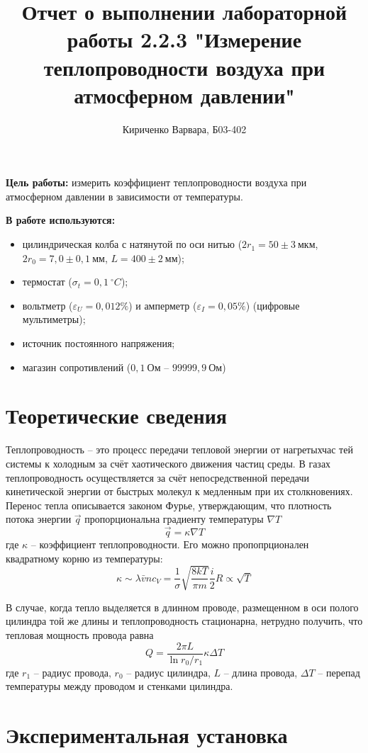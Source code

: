 \documentclass[12pt, a4paper]{article}
\title{\textbf{Отчет о выполнении лабораторной работы 2.2.3 "Измерение теплопроводности воздуха при атмосферном давлении"}}
\author{Кириченко Варвара, Б03-402}
\date{}
\begin{document}
\maketitle

\clearpage

\textbf{Цель работы:}
измерить коэффициент теплопроводности воздуха при атмосферном давлении в зависимости от температуры.
\newline


\textbf{В работе используются:}
\begin{itemize}
\item цилиндрическая колба с натянутой по оси нитью ($2r_1=50\pm3\ мкм$, $2r_0=7,0\pm0,1\ мм$, $L=400\pm2\ мм$);
\item термостат ($\sigma_{t}=0,1\ ^\circ C$);
\item вольтметр ($\varepsilon_{U}=0,012\%$) и амперметр ($\varepsilon_{I}=0,05\%$) (цифровые мультиметры);
\item источник постоянного напряжения;
\item магазин сопротивлений ($0,1\ Ом$ -- $99999,9\ Ом$)
\end{itemize}

\section{Теоретические сведения}

Теплопроводность -- это процесс передачи тепловой энергии от нагретыхчас тей системы к холодным за счёт хаотического движения частиц среды. В газах теплопроводность осуществляется за счёт непосредственной передачи кинетической энергии от быстрых молекул к медленным при их столкновениях.
Перенос тепла описывается законом Фурье, утверждающим, что плотность потока энергии $\vec{q}$ пропорциональна градиенту температуры $\nabla T$
\[\vec{q}=\kappa\nabla T\]
где $\kappa$ -- коэффициент теплопроводности. Его можно пропопрционален квадратному корню из температуры:
\[\kappa\sim\lambda\bar{v}nc_V=\frac{1}{\sigma}\sqrt{\frac{8kT}{\pi m}}\frac{i}{2}R\propto\sqrt{T}\]

В случае, когда тепло выделяется в длинном проводе, размещенном в оси полого цилиндра той же длины и теплопроводность стационарна, нетрудно получить, что тепловая мощность провода равна
\[Q=\frac{2\pi L}{\ln r_0/r_1}\kappa\Delta T\]
где $r_1$ -- радиус провода, $r_0$ -- радиус цилиндра, $L$ -- длина провода, $\Delta T$ -- перепад температуры между проводом и стенками цилиндра.

\section{Экспериментальная установка}
\end{document}
